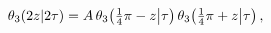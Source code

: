 \[\mathop{\theta_{3}\/}\nolimits\!\left(2z\middle|2\tau\right)=A\mathop{\theta_{%
3}\/}\nolimits\!\left(\tfrac{1}{4}\pi-z\middle|\tau\right)\mathop{\theta_{3}\/%
}\nolimits\!\left(\tfrac{1}{4}\pi+z\middle|\tau\right),\]